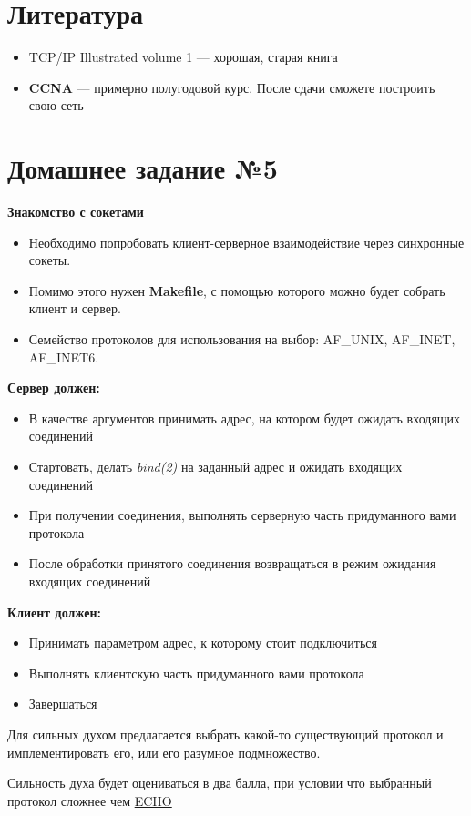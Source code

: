 \documentclass[../../lectures.tex]{subfiles}
\begin{document}
\newpage
\section{Литература}
\begin{itemize}
    \item TCP/IP Illustrated volume 1 --- хорошая, старая книга
    \item \textbf{CCNA} --- примерно полугодовой курс. После сдачи сможете построить свою сеть
\end{itemize}

\section{Домашнее задание №5}
\textbf{Знакомство с сокетами}
\begin{itemize}
    \item Необходимо попробовать клиент-серверное взаимодействие через синхронные сокеты.
    \item Помимо этого нужен \textbf{Makefile}, с помощью которого можно будет собрать клиент и сервер.
    \item Семейство протоколов для использования на выбор: AF\_UNIX, AF\_INET, AF\_INET6.
\end{itemize}

\textbf{Сервер должен:}
\begin{itemize}
    \item В качестве аргументов принимать адрес, на котором будет ожидать входящих соединений
    \item Стартовать, делать \emph{bind(2)} на заданный адрес и ожидать входящих соединений
    \item При получении соединения, выполнять серверную часть придуманного вами протокола
    \item После обработки принятого соединения возвращаться в режим ожидания входящих соединений
\end{itemize}

\textbf{Клиент должен:}
\begin{itemize}
    \item Принимать параметром адрес, к которому стоит подключиться
    \item Выполнять клиентскую часть придуманного вами протокола
    \item Завершаться
\end{itemize}

Для сильных духом предлагается выбрать какой-то существующий протокол и имплементировать его, или его разумное подмножество.

Сильность духа будет оцениваться в два балла, при условии что выбранный протокол сложнее чем \textcolor{blue}{\href{https://tools.ietf.org/html/rfc862}{ECHO}}
\end{document}
